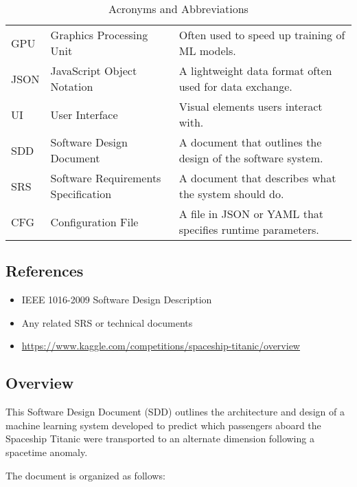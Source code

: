 \documentclass[15pt]{article}
\begin{document}
\begin{table}[h!]
\begin{tabular}{|l|l|p{8cm}|}
    GPU   & Graphics Processing Unit           & Often used to speed up training of ML models. \\
    JSON  & JavaScript Object Notation         & A lightweight data format often used for data exchange. \\
    UI    & User Interface                     & Visual elements users interact with. \\
    SDD   & Software Design Document           & A document that outlines the design of the software system. \\
    SRS   & Software Requirements Specification & A document that describes what the system should do. \\
    CFG   & Configuration File                 & A file in JSON or YAML that specifies runtime parameters. \\
    \hline
    \end{tabular}
    \caption{Acronyms and Abbreviations}
\end{table}

\subsection{References}
\begin{itemize}
    \item IEEE 1016-2009 Software Design Description
    \item Any related SRS or technical documents
    \item \url{https://www.kaggle.com/competitions/spaceship-titanic/overview}
\end{itemize}

\subsection{Overview}
This Software Design Document (SDD) outlines the architecture and design of a machine learning system developed to predict which passengers aboard the Spaceship Titanic were transported to an alternate dimension following a spacetime anomaly.

The document is organized as follows:
\end{document}
